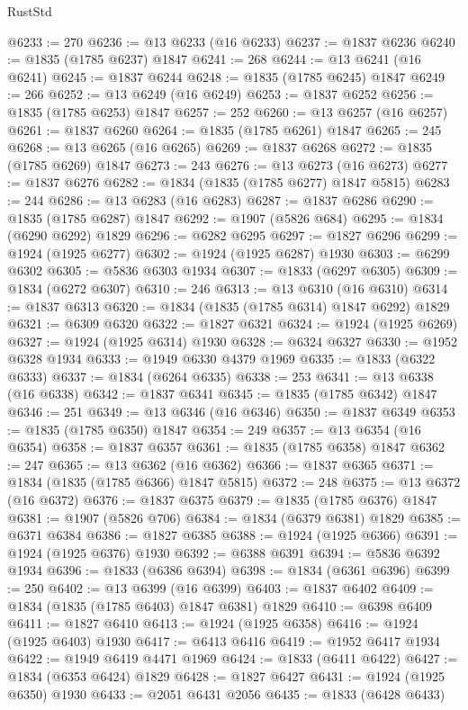 \begin{lexlean}{RustStd}
\begin{coremodule}
@6233 := 270
@6236 := @13 @6233 (@16 @6233)
@6237 := @1837 @6236
@6240 := @1835 (@1785 @6237) @1847
@6241 := 268
@6244 := @13 @6241 (@16 @6241)
@6245 := @1837 @6244
@6248 := @1835 (@1785 @6245) @1847
@6249 := 266
@6252 := @13 @6249 (@16 @6249)
@6253 := @1837 @6252
@6256 := @1835 (@1785 @6253) @1847
@6257 := 252
@6260 := @13 @6257 (@16 @6257)
@6261 := @1837 @6260
@6264 := @1835 (@1785 @6261) @1847
@6265 := 245
@6268 := @13 @6265 (@16 @6265)
@6269 := @1837 @6268
@6272 := @1835 (@1785 @6269) @1847
@6273 := 243
@6276 := @13 @6273 (@16 @6273)
@6277 := @1837 @6276
@6282 := @1834 (@1835 (@1785 @6277) @1847 @5815)
@6283 := 244
@6286 := @13 @6283 (@16 @6283)
@6287 := @1837 @6286
@6290 := @1835 (@1785 @6287) @1847
@6292 := @1907 (@5826 @684)
@6295 := @1834 (@6290 @6292) @1829
@6296 := @6282 @6295
@6297 := @1827 @6296
@6299 := @1924 (@1925 @6277)
@6302 := @1924 (@1925 @6287) @1930
@6303 := @6299 @6302
@6305 := @5836 @6303 @1934
@6307 := @1833 (@6297 @6305)
@6309 := @1834 (@6272 @6307)
@6310 := 246
@6313 := @13 @6310 (@16 @6310)
@6314 := @1837 @6313
@6320 := @1834 (@1835 (@1785 @6314) @1847 @6292) @1829
@6321 := @6309 @6320
@6322 := @1827 @6321
@6324 := @1924 (@1925 @6269)
@6327 := @1924 (@1925 @6314) @1930
@6328 := @6324 @6327
@6330 := @1952 @6328 @1934
@6333 := @1949 @6330 @4379 @1969
@6335 := @1833 (@6322 @6333)
@6337 := @1834 (@6264 @6335)
@6338 := 253
@6341 := @13 @6338 (@16 @6338)
@6342 := @1837 @6341
@6345 := @1835 (@1785 @6342) @1847
@6346 := 251
@6349 := @13 @6346 (@16 @6346)
@6350 := @1837 @6349
@6353 := @1835 (@1785 @6350) @1847
@6354 := 249
@6357 := @13 @6354 (@16 @6354)
@6358 := @1837 @6357
@6361 := @1835 (@1785 @6358) @1847
@6362 := 247
@6365 := @13 @6362 (@16 @6362)
@6366 := @1837 @6365
@6371 := @1834 (@1835 (@1785 @6366) @1847 @5815)
@6372 := 248
@6375 := @13 @6372 (@16 @6372)
@6376 := @1837 @6375
@6379 := @1835 (@1785 @6376) @1847
@6381 := @1907 (@5826 @706)
@6384 := @1834 (@6379 @6381) @1829
@6385 := @6371 @6384
@6386 := @1827 @6385
@6388 := @1924 (@1925 @6366)
@6391 := @1924 (@1925 @6376) @1930
@6392 := @6388 @6391
@6394 := @5836 @6392 @1934
@6396 := @1833 (@6386 @6394)
@6398 := @1834 (@6361 @6396)
@6399 := 250
@6402 := @13 @6399 (@16 @6399)
@6403 := @1837 @6402
@6409 := @1834 (@1835 (@1785 @6403) @1847 @6381) @1829
@6410 := @6398 @6409
@6411 := @1827 @6410
@6413 := @1924 (@1925 @6358)
@6416 := @1924 (@1925 @6403) @1930
@6417 := @6413 @6416
@6419 := @1952 @6417 @1934
@6422 := @1949 @6419 @4471 @1969
@6424 := @1833 (@6411 @6422)
@6427 := @1834 (@6353 @6424) @1829
@6428 := @1827 @6427
@6431 := @1924 (@1925 @6350) @1930
@6433 := @2051 @6431 @2056
@6435 := @1833 (@6428 @6433)

\end{coremodule}
\end{lexlean}
